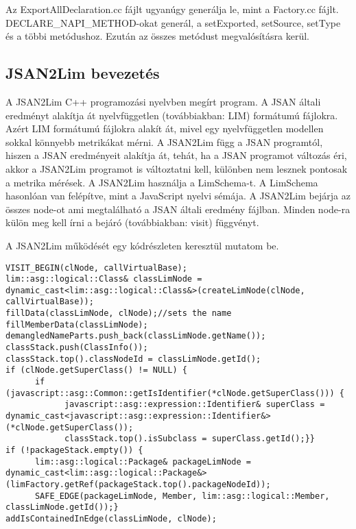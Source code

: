 \noindent

Az ExportAllDeclaration.cc fájlt ugyanúgy generálja le, mint a Factory.cc fájlt. DECLARE\_NAPI\_METHOD-okat generál, a setExported, setSource, setType és a többi metódushoz.
Ezután az összes metódust megvalósításra kerül.

\subsection{JSAN2Lim bevezetés}

\noindent

A JSAN2Lim C++ programozási nyelvben megírt program. A JSAN általi eredményt alakítja át nyelvfüggetlen (továbbiakban: LIM) formátumú fájlokra.
Azért LIM formátumú fájlokra alakít át, mivel egy nyelvfüggetlen modellen sokkal könnyebb metrikákat mérni.
A JSAN2Lim függ a JSAN programtól, hiszen a JSAN eredményeit alakítja át, tehát, ha a JSAN programot változás éri, akkor a JSAN2Lim programot is változtatni kell, különben nem lesznek pontosak a metrika mérések.
A JSAN2Lim használja a LimSchema-t. A LimSchema hasonlóan van felépítve, mint a JavaScript nyelvi sémája.
A JSAN2Lim bejárja az összes node-ot ami megtalálható a JSAN általi eredmény fájlban.
Minden node-ra külön meg kell írni a bejáró (továbbiakban: visit) függvényt.

\noindent

A JSAN2Lim működését egy kódrészleten keresztül mutatom be.
\begin{lstlisting}[caption={ClassDeclaration Visitor}, label={lst:classdeclaration_visitor}, language={CStyle}]
VISIT_BEGIN(clNode, callVirtualBase);
lim::asg::logical::Class& classLimNode = dynamic_cast<lim::asg::logical::Class&>(createLimNode(clNode, callVirtualBase));
fillData(classLimNode, clNode);//sets the name
fillMemberData(classLimNode);
demangledNameParts.push_back(classLimNode.getName());
classStack.push(ClassInfo());
classStack.top().classNodeId = classLimNode.getId();
if (clNode.getSuperClass() != NULL) {
      if (javascript::asg::Common::getIsIdentifier(*clNode.getSuperClass())) {
            javascript::asg::expression::Identifier& superClass = dynamic_cast<javascript::asg::expression::Identifier&>(*clNode.getSuperClass());
            classStack.top().isSubclass = superClass.getId();}}
if (!packageStack.empty()) {
      lim::asg::logical::Package& packageLimNode = dynamic_cast<lim::asg::logical::Package&>(limFactory.getRef(packageStack.top().packageNodeId));
      SAFE_EDGE(packageLimNode, Member, lim::asg::logical::Member, classLimNode.getId());}
addIsContainedInEdge(classLimNode, clNode);
\end{lstlisting}

